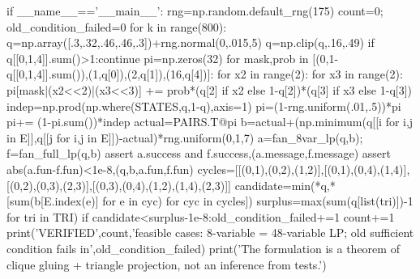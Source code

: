 \documentclass[11pt,a4paper]{ctexart}
\theoremstyle{remark}\newtheorem{remark}[theorem]{说明}
\begin{document}
\begin{CodeListing}
if __name__=='__main__':
    rng=np.random.default_rng(175)
    count=0; old_condition_failed=0
    for k in range(800):
        q=np.array([.3,.32,.46,.46,.3])+rng.normal(0,.015,5)
        q=np.clip(q,.16,.49)
        if q[[0,1,4]].sum()>1:continue
        pi=np.zeros(32)
        for mask,prob in [(0,1-q[[0,1,4]].sum()),(1,q[0]),(2,q[1]),(16,q[4])]:
            for x2 in range(2):
                for x3 in range(2):
                    pi[mask|(x2<<2)|(x3<<3)] += prob*(q[2] if x2 else 1-q[2])*(q[3] if x3 else 1-q[3])
        indep=np.prod(np.where(STATES,q,1-q),axis=1)
        pi=(1-rng.uniform(.01,.5))*pi
        pi+= (1-pi.sum())*indep
        actual=PAIRS.T@pi
        b=actual+(np.minimum(q[[i for i,j in E]],q[[j for i,j in E]])-actual)*rng.uniform(0,1,7)
        a=fan_8var_lp(q,b); f=fan_full_lp(q,b)
        assert a.success and f.success,(a.message,f.message)
        assert abs(a.fun-f.fun)<1e-8,(q,b,a.fun,f.fun)
        cycles=[[(0,1),(0,2),(1,2)],[(0,1),(0,4),(1,4)],[(0,2),(0,3),(2,3)],[(0,3),(0,4),(1,2),(1,4),(2,3)]]
        candidate=min(*q,*[sum(b[E.index(e)] for e in cyc) for cyc in cycles])
        surplus=max(sum(q[list(tri)])-1 for tri in TRI)
        if candidate<surplus-1e-8:old_condition_failed+=1
        count+=1
    print('VERIFIED',count,'feasible cases: 8-variable = 48-variable LP; old sufficient condition fails in',old_condition_failed)
    print('The formulation is a theorem of clique gluing + triangle projection, not an inference from tests.')
\end{CodeListing}
\end{document}
